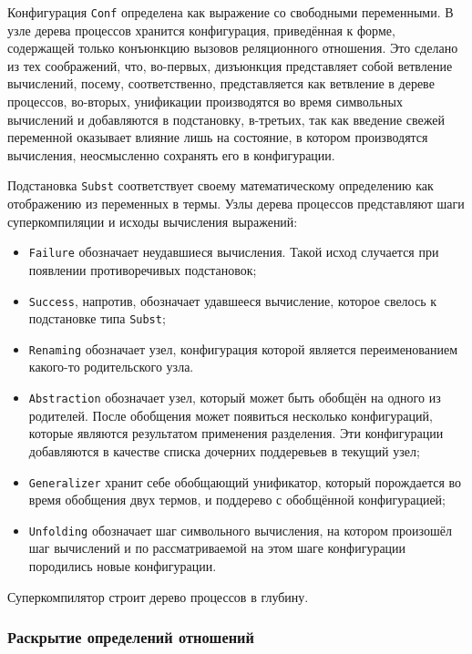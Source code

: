 Конфигурация \lstinline{Conf} определена как выражение со свободными переменными.
В узле дерева процессов хранится конфигурация, приведённая к форме, содержащей только конъюнкцию вызовов
реляционного отношения. Это сделано из тех соображений, что, во-первых, дизъюнкция представляет
собой ветвление вычислений, посему, соответственно, представляется как ветвление в дереве процессов,
во-вторых, унификации производятся во время символьных вычислений и добавляются в подстановку,
в-третьих, так как введение свежей переменной оказывает влияние лишь на состояние, в котором производятся вычисления,
неосмысленно сохранять его в конфигурации.

Подстановка \lstinline{Subst} соответствует своему математическому определению
как отображению из переменных в термы.
Узлы дерева процессов представляют шаги суперкомпиляции и исходы вычисления выражений:
\begin{itemize}
\item \lstinline{Failure} обозначает неудавшиеся вычисления. Такой исход
      случается при появлении противоречивых подстановок;
\item \lstinline{Success}, напротив, обозначает удавшееся вычисление, которое свелось к подстановке типа \lstinline{Subst};
\item \lstinline{Renaming} обозначает узел, конфигурация которой является переименованием какого-то родительского узла.
\item \lstinline{Abstraction} обозначает узел, который может быть обобщён на одного из
      родителей. После обобщения может появиться несколько конфигураций, которые являются
      результатом применения разделения. Эти конфигурации добавляются в качестве списка
      дочерних поддеревьев в текущий узел;
\item \lstinline{Generalizer} хранит себе обобщающий унификатор, который порождается во время обобщения
      двух термов, и поддерево с обобщённой конфигурацией;
\item \lstinline{Unfolding} обозначает шаг символьного вычисления, на котором произошёл шаг вычислений
      и по рассматриваемой на этом шаге конфигурации породились новые конфигурации.
\end{itemize}

Суперкомпилятор строит дерево процессов в глубину. 

\subsubsection{Раскрытие определений отношений}

